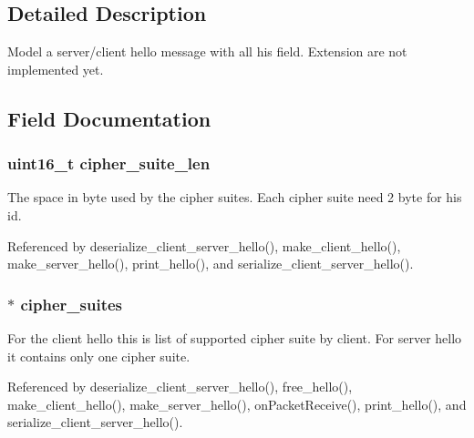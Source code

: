 \subsection{Detailed Description}
Model a server/client hello message with all his field. Extension are not implemented yet. 

\subsection{Field Documentation}
\subsubsection[{\texorpdfstring{cipher\+\_\+suite\+\_\+len}{cipher_suite_len}}]{\setlength{\rightskip}{0pt plus 5cm}uint16\+\_\+t cipher\+\_\+suite\+\_\+len}\hypertarget{structserver__client__hello__t_a706adb2fc3f8fa8fe9bdd5793f32183e}{}\label{structserver__client__hello__t_a706adb2fc3f8fa8fe9bdd5793f32183e}
The space in byte used by the cipher suites. Each cipher suite need 2 byte for his id. 

Referenced by deserialize\+\_\+client\+\_\+server\+\_\+hello(), make\+\_\+client\+\_\+hello(), make\+\_\+server\+\_\+hello(), print\+\_\+hello(), and serialize\+\_\+client\+\_\+server\+\_\+hello().

\subsubsection[{\texorpdfstring{cipher\+\_\+suites}{cipher_suites}}]{$\ast$ cipher\+\_\+suites}\hypertarget{structserver__client__hello__t_a545e2b09874bc2250aed603ef61820a6}{}\label{structserver__client__hello__t_a545e2b09874bc2250aed603ef61820a6}
For the client hello this is list of supported cipher suite by client. For server hello it contains only one cipher suite. 

Referenced by deserialize\+\_\+client\+\_\+server\+\_\+hello(), free\+\_\+hello(), make\+\_\+client\+\_\+hello(), make\+\_\+server\+\_\+hello(), on\+Packet\+Receive(), print\+\_\+hello(), and serialize\+\_\+client\+\_\+server\+\_\+hello().

